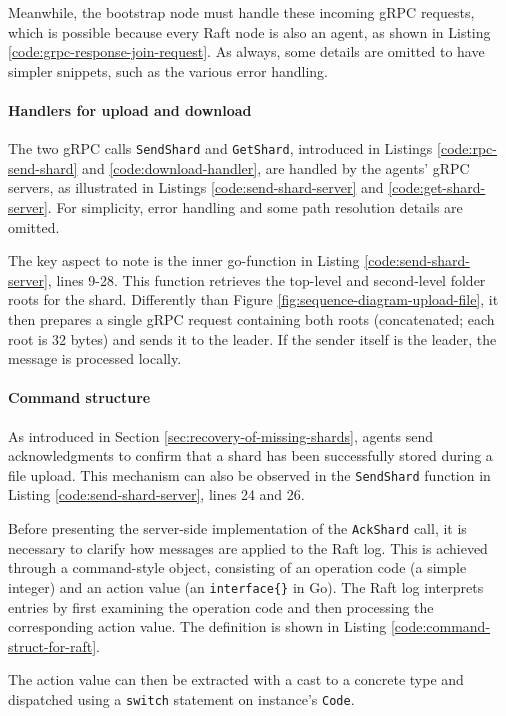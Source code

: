 Meanwhile, the bootstrap node must handle these incoming gRPC requests, which is possible because every Raft node is also an agent, as shown in Listing \ref{code:grpc-response-join-request}. As always, some details are omitted to have simpler snippets, such as the various error handling.

\paragraph{Handlers for upload and download}

The two gRPC calls \texttt{SendShard} and \texttt{GetShard}, introduced in Listings \ref{code:rpc-send-shard} and \ref{code:download-handler}, are handled by the agents’ gRPC servers, as illustrated in Listings \ref{code:send-shard-server} and \ref{code:get-shard-server}. For simplicity, error handling and some path resolution details are omitted.

The key aspect to note is the inner go-function in Listing \ref{code:send-shard-server}, lines 9-28. This function retrieves the top-level and second-level folder roots for the shard. Differently than Figure \ref{fig:sequence-diagram-upload-file}, it then prepares a single gRPC request containing both roots (concatenated; each root is 32 bytes) and sends it to the leader. If the sender itself is the leader, the message is processed locally.

\paragraph{Command structure}

As introduced in Section \ref{sec:recovery-of-missing-shards}, agents send acknowledgments to confirm that a shard has been successfully stored during a file upload. This mechanism can also be observed in the \texttt{SendShard} function in Listing \ref{code:send-shard-server}, lines 24 and 26.

Before presenting the server-side implementation of the \texttt{AckShard} call,
it is necessary to clarify how messages are applied to the Raft log. This is
achieved through a command-style object, consisting of an operation code (a
simple integer) and an action value (an \texttt{interface\{\}} in Go). The Raft log interprets entries by first examining the operation code and then processing the corresponding action value. The definition is shown in Listing \ref{code:command-struct-for-raft}.


The action value can then be extracted with a cast to a concrete type and
dispatched using a \texttt{switch} statement on instance's \texttt{Code}.

